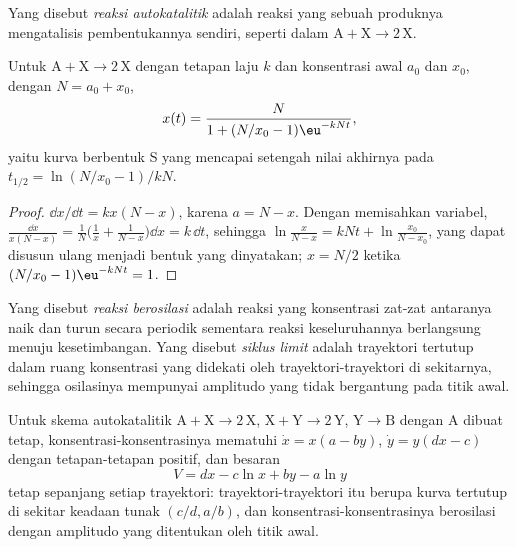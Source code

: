 \begin{definition}\label{def:b3:complex-kinetics:autocatalysis}
Yang disebut \emph{reaksi autokatalitik} adalah
reaksi yang sebuah produknya mengatalisis pembentukannya sendiri, seperti
dalam $\mathrm{A + X \to 2\,X}$.
\end{definition}

\begin{proposition}\label{prop:b3:complex-kinetics:logistic}
Untuk $\mathrm{A + X \to 2\,X}$ dengan tetapan laju $k$ dan konsentrasi awal $a_0$
dan $x_0$, dengan $N = a_0 + x_0$,
\[
  x(t) = \frac{N}{1 + (N/x_0 - 1)\eu^{-kNt}},
\]
yaitu kurva berbentuk S yang mencapai setengah nilai akhirnya pada $t_{1/2} = \ln(N/x_0 - 1)/kN$.
\end{proposition}

\begin{proof}
$\dd x/\dd t = kx(N - x)$, karena $a = N - x$. Dengan memisahkan variabel, $\frac{\dd x}{x(N - x)} = \frac1N\bigl(\frac1x + \frac{1}{N - x}\bigr)\dd x
= k\,\dd t$, sehingga $\ln\frac{x}{N - x} = kNt + \ln\frac{x_0}{N - x_0}$, yang dapat
disusun ulang menjadi bentuk yang dinyatakan; $x = N/2$ ketika
$(N/x_0 - 1)\eu^{-kNt} = 1$.
\end{proof}

\begin{definition}\label{def:b3:complex-kinetics:oscillating}
Yang disebut \emph{reaksi berosilasi} adalah reaksi
yang konsentrasi zat-zat antaranya naik dan turun secara periodik sementara
reaksi keseluruhannya berlangsung menuju kesetimbangan. Yang disebut
\emph{siklus limit} adalah trayektori tertutup dalam ruang
konsentrasi yang didekati oleh trayektori-trayektori di sekitarnya, sehingga
osilasinya mempunyai amplitudo yang tidak bergantung pada titik awal.
\end{definition}

\begin{theorem}\label{thm:b3:complex-kinetics:lotka-volterra}
Untuk skema autokatalitik $\mathrm{A + X \to 2\,X}$, $\mathrm{X + Y \to 2\,Y}$,
$\mathrm{Y \to B}$ dengan A dibuat tetap, konsentrasi-konsentrasinya mematuhi
$\dot x = x(a - by)$, $\dot y = y(dx - c)$ dengan tetapan-tetapan positif, dan
besaran
\[
  V = dx - c\ln x + by - a\ln y
\]
tetap sepanjang setiap trayektori: trayektori-trayektori itu berupa kurva
tertutup di sekitar keadaan tunak $(c/d, a/b)$, dan konsentrasi-konsentrasinya
berosilasi dengan amplitudo yang ditentukan oleh titik awal.
\end{theorem}


